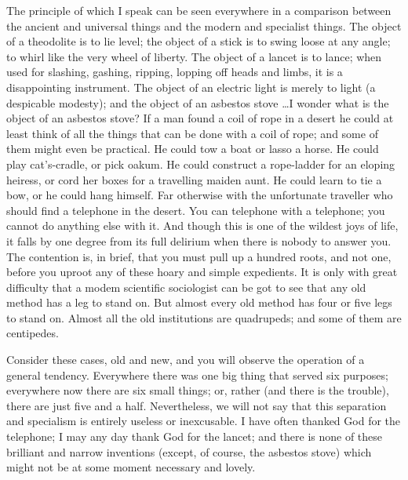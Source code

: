 \documentclass[final,10pt,letterpaper,twocolumn,openany]{book}
\begin{document}
The principle of which I speak can be seen everywhere in a
comparison between the ancient and universal things and the modern and
specialist things. The object of a theodolite is to lie level; the object of a
stick is to swing loose at any angle; to whirl like the very wheel of liberty.
The object of a lancet is to lance; when used for slashing, gashing, ripping,
lopping off heads and limbs, it is a disappointing instrument. The object of
an electric light is merely to light (a despicable modesty); and the object of
an asbestos stove \ldots I wonder what is the object of an asbestos stove? If a
man found a coil of rope in a desert he could at least think of all the things
that can be done with a coil of rope; and some of them might even be
practical. He could tow a boat or lasso a horse. He could play cat's-cradle,
or pick oakum. He could construct a rope-ladder for an eloping heiress, or
cord her boxes for a travelling maiden aunt. He could learn to tie a bow, or
he could hang himself. Far otherwise with the unfortunate traveller who
should find a telephone in the desert. You can telephone with a telephone;
you cannot do anything else with it. And though this is one of the wildest
joys of life, it falls by one degree from its full delirium when there is
nobody to answer you. The contention is, in brief, that you must pull up a
hundred roots, and not one, before you uproot any of these hoary and
simple expedients. It is only with great difficulty that a modem scientific
sociologist can be got to see that any old method has a leg to stand on. But
almost every old method has four or five legs to stand on. Almost all the
old institutions are quadrupeds; and some of them are centipedes.

Consider these cases, old and new, and you will observe the operation
of a general tendency. Everywhere there was one big thing that served six
purposes; everywhere now there are six small things; or, rather (and there
is the trouble), there are just five and a half. Nevertheless, we will not say
that this separation and specialism is entirely useless or inexcusable. I
have often thanked God for the telephone; I may any day thank God for
the lancet; and there is none of these brilliant and narrow inventions
(except, of course, the asbestos stove) which might not be at some moment
necessary and lovely. 
\end{document}
